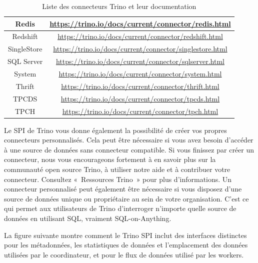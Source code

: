 \begin{table}[ht]
\begin{tabular}{|c|c|}
	Redis & \href{https://trino.io/docs/current/connector/redis.html}{https://trino.io/docs/current/connector/redis.html} \\ \hline
	Redshift & \href{https://trino.io/docs/current/connector/redshift.html}{https://trino.io/docs/current/connector/redshift.html} \\ \hline
	SingleStore & \href{https://trino.io/docs/current/connector/singlestore.html}{https://trino.io/docs/current/connector/singlestore.html} \\ \hline
	SQL Server & \href{https://trino.io/docs/current/connector/sqlserver.html}{https://trino.io/docs/current/connector/sqlserver.html} \\ \hline
	System & \href{https://trino.io/docs/current/connector/system.html}{https://trino.io/docs/current/connector/system.html} \\ \hline
	Thrift & \href{https://trino.io/docs/current/connector/thrift.html}{https://trino.io/docs/current/connector/thrift.html} \\ \hline
	TPCDS & \href{https://trino.io/docs/current/connector/tpcds.html}{https://trino.io/docs/current/connector/tpcds.html} \\ \hline
	TPCH & \href{https://trino.io/docs/current/connector/tpch.html}{https://trino.io/docs/current/connector/tpch.html} \\ \hline
\end{tabular}
\caption{Liste des connecteurs Trino et leur documentation}
\end{table}

Le SPI de Trino vous donne également la possibilité de créer vos propres connecteurs personnalisés. Cela peut être nécessaire si vous avez besoin d'accéder à une source de données sans connecteur compatible. Si vous finissez par créer un connecteur, nous vous encourageons fortement à en savoir plus sur la communauté open source Trino, à utiliser notre aide et à contribuer votre connecteur. Consultez « Ressources Trino » pour plus d'informations. Un connecteur personnalisé peut également être nécessaire si vous disposez d'une source de données unique ou propriétaire au sein de votre organisation. C'est ce qui permet aux utilisateurs de Trino d'interroger n'importe quelle source de données en utilisant SQL, vraiment SQL-on-Anything.

La figure suivante montre comment le Trino SPI inclut des interfaces distinctes pour les métadonnées, les statistiques de données et l'emplacement des données utilisées par le coordinateur, et pour le flux de données utilisé par les workers.

